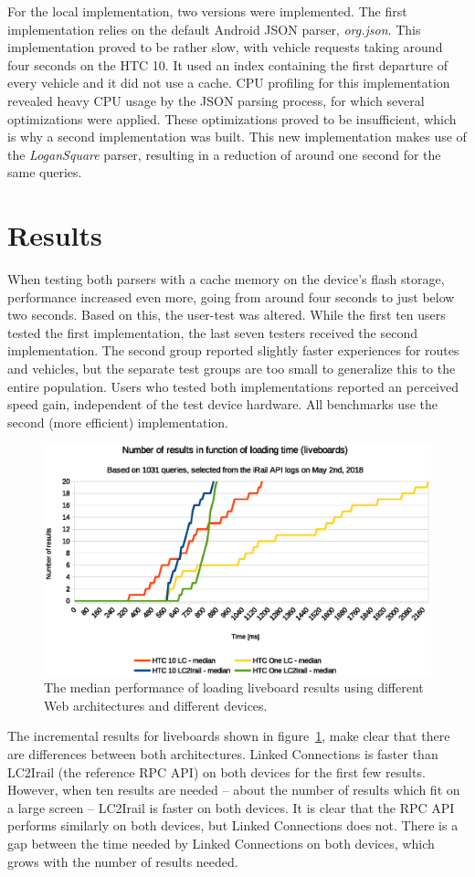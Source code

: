 \documentclass[twocolumn]{phdsymp} %
\begin{document}
For the local implementation, two versions were implemented. The first implementation relies on the default Android JSON parser, \emph{org.json}. This implementation proved to be rather slow, with vehicle requests taking around four seconds on the HTC 10. It used an index containing the first departure of every vehicle and it did not use a cache. CPU profiling for this implementation revealed heavy CPU usage by the JSON parsing process, for which several optimizations were applied. These optimizations proved to be insufficient, which is why a second implementation was built. This new implementation makes use of the \emph{LoganSquare} parser, resulting in a reduction of around one second for the same queries.

\section{Results}

When testing both parsers with a cache memory on the device’s flash storage, performance increased even more, going from around four seconds to just below two seconds. Based on this, the user-test was altered. While the first ten users tested the first implementation, the last seven testers received the second implementation. The second group reported slightly faster experiences for routes and vehicles, but the separate test groups are too small to generalize this to the entire population. Users who tested both implementations reported an perceived speed gain, independent of the test device hardware. All benchmarks use the second (more efficient) implementation.


\begin{figure}[ht]
	\begin{center}
		\includegraphics[width=.50\textwidth]{images/dief_liveboards_average.eps}
		\caption{\label{fig:liveboard} The median performance of loading liveboard results using different Web architectures and different devices.}
	\end{center}
\end{figure}

The incremental results for liveboards shown in figure~\ref{fig:liveboard}, make clear that there are differences between both architectures. Linked Connections is faster than LC2Irail (the reference \textsc{RPC} API) on both devices for the first few results. However, when ten results are needed – about the number of results which fit on a large screen – LC2Irail is faster on both devices. It is clear that the \textsc{RPC} API performs similarly on both devices, but Linked Connections does not. There is a gap between the time needed by Linked Connections on both devices, which grows with the number of results needed.
\end{document}

